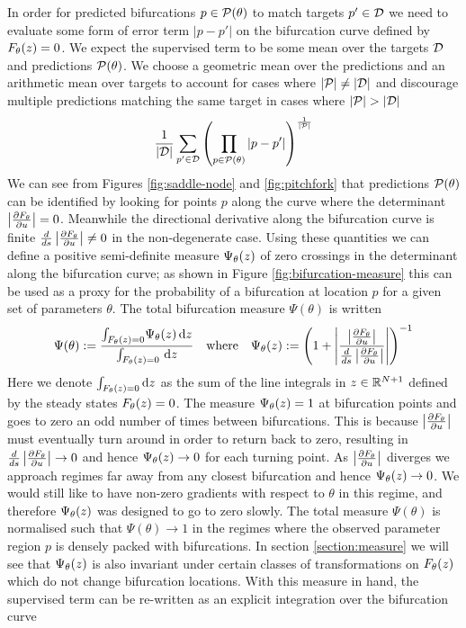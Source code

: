 In order for predicted bifurcations $p\in\mathcal{P}(\theta)$ to match targets $p'\in\mathcal{D}$ we need to evaluate some form of error term $|p-p'|$ on the bifurcation curve defined by $F_{\theta}(z)=0$. We expect the supervised term to be some mean over the targets $\mathcal{D}$ and predictions $\mathcal{P}(\theta)$. We choose a geometric mean over the predictions and an arithmetic mean over targets to account for cases where $|\mathcal{P}|\neq|\mathcal{D}|$ and discourage multiple predictions matching the same target in cases where $|\predictions|>|\targets|$
\begin{align}
    \frac{1}{|\mathcal{D}|}\sum_{p'\in\mathcal{D}}
    \left(\prod_{p\in\mathcal{P}(\theta)}|p-p'|\right)
    ^{\frac{1}{|\mathcal{P}|}}
\end{align}
We can see from Figures \ref{fig:saddle-node} and \ref{fig:pitchfork} that predictions $\mathcal{P}(\theta)$ can be identified by looking for points $p$ along the curve where the determinant $\left| \frac{\partial F_{\theta}}{\partial u} \right|=0$. Meanwhile the directional derivative along the bifurcation curve is finite $\frac{d}{ds}\left| \frac{\partial F_{\theta}}{\partial u} \right|\neq 0$ in the non-degenerate case. Using these quantities we can define a positive semi-definite measure $\Psi_{\theta}(z)$ of zero crossings in the determinant along the bifurcation curve; as shown in Figure \ref{fig:bifurcation-measure} this can be used as a proxy for the probability of a bifurcation at location $p$ for a given set of parameters $\theta$. The total bifurcation measure $\Psi(\theta)$ is written
\begin{align}
    \Psi(\theta):=\frac{
        \int_{F_{\theta}(z)=0}\!
        \Psi_{\theta}(z)\,\mathrm{d}z
    }{
        \int_{F_{\theta}(z)=0}\!\
        \mathrm{d}z
    }
    \quad\mathrm{where}\quad
    \Psi_{\theta}(z):=
    \left(1+\left|\frac{\left| \frac{\partial F_{\theta}}{\partial u} \right|}{\frac{d}{ds}\left| \frac{\partial F_{\theta}}{\partial u} \right|}\right|\right)^{-1}
    \label{eq:measure}
\end{align}
Here we denote $\int_{F_{\theta}(z)=0}\mathrm{d}z$ as the sum of the line integrals in $z\in\mathbb{R}^{N+1}$ defined by the steady states $F_{\theta}(z)=0$. The measure $\Psi_{\theta}(z)=1$ at bifurcation points and goes to zero an odd number of times between bifurcations. This is because $\left| \frac{\partial F_{\theta}}{\partial u} \right|$ must eventually turn around in order to return back to zero, resulting in $\frac{d}{ds}\left| \frac{\partial F_{\theta}}{\partial u} \right|\rightarrow0$ and hence $\Psi_{\theta}(z)\rightarrow0$ for each turning point. As $\left| \frac{\partial F_{\theta}}{\partial u} \right|$ diverges we approach regimes far away from any closest bifurcation and hence $\Psi_{\theta}(z)\rightarrow0$. We would still like to have non-zero gradients with respect to $\theta$ in this regime, and therefore $\Psi_{\theta}(z)$ was designed to go to zero slowly. The total measure $\Psi(\theta)$ is normalised such that $\Psi(\theta)\rightarrow1$ in the regimes where the observed parameter region $p$ is densely packed with bifurcations. In section \ref{section:measure} we will see that $\Psi_{\theta}(z)$ is also invariant under certain classes of transformations on $F_{\theta}(z)$ which do not change bifurcation locations. With this measure in hand, the supervised term can be re-written as an explicit integration over the bifurcation curve

